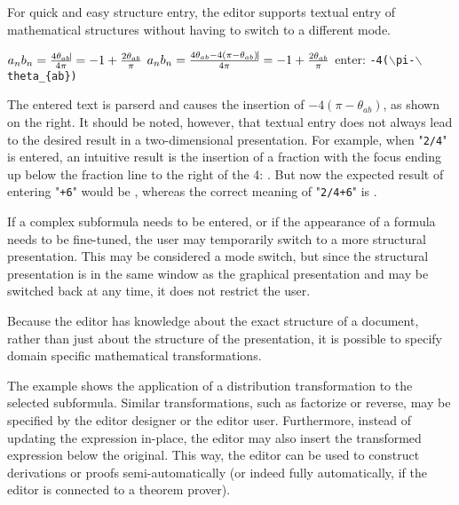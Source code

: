 
For quick and easy structure entry, the editor supports textual entry of mathematical structures without having to switch to a different mode.

\editScreenshot
{$a_nb_n = \frac{4\theta_{ab}\vline}{4\pi } = -1 + \frac{2\theta_{ab}}{\pi}$}
{$a_nb_n = \frac{4\theta_{ab} - 4(\pi - \theta_{ab})\vline}{4\pi } = -1 + \frac{2\theta_{ab}}{\pi}$}
{enter:  {\tt -4($\backslash$pi-$\backslash$theta\_\{ab\})}}{}

The entered text is parserd and causes the insertion of $- 4(\pi - \theta_{ab})$, as shown on the right.  It should be noted, however, that textual entry does not always lead to the desired result in a two-dimensional presentation. For example, when "\verb|2/4|" is entered, an intuitive result is the insertion of a fraction with the focus ending up below the fraction line to the right of the 4: . But now the expected result of entering "\verb|+6|" would be , whereas the correct meaning of "\verb|2/4+6|" is .

If a complex subformula needs to be entered, or if the appearance of a formula needs to be fine-tuned, the user may temporarily switch to a more structural presentation. This may be considered a mode switch, but since the structural presentation is in the same window as the graphical presentation and may be switched back at any time, it does not restrict the user.


Because the editor has knowledge about the exact structure of a document, rather than just about the structure of the presentation, it is possible to specify domain specific mathematical transformations.


The example shows the application of a distribution transformation to the selected subformula. Similar transformations, such as factorize or reverse, may be specified by the editor designer or the editor user. Furthermore, instead of updating the expression in-place, the editor may also insert the transformed expression below the original. This way, the editor can be used to construct derivations or proofs semi-automatically (or indeed fully automatically, if the editor is connected to a theorem prover).

